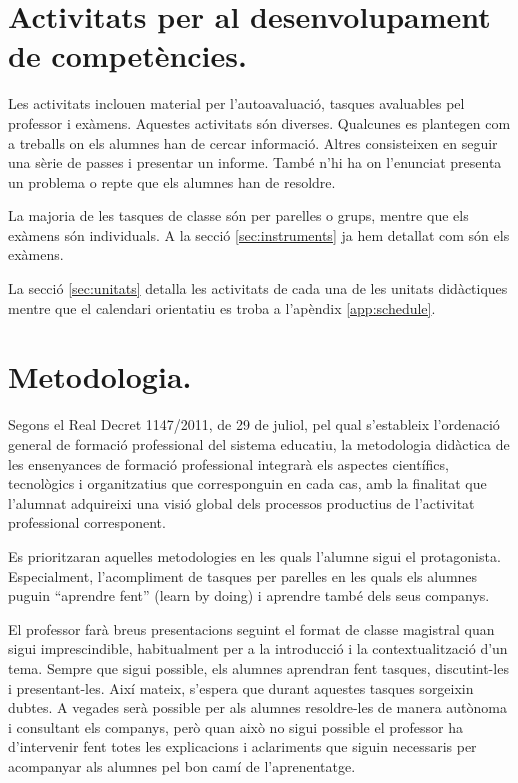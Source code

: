 \documentclass[catalan, a4paper, 12pt, titlepage]{article}
\begin{document}
\section{Activitats per al desenvolupament de competències.}
\label{sec:activitats}

Les activitats inclouen material per l'autoavaluació, tasques avaluables pel professor i exàmens.
Aquestes activitats són diverses.
Qualcunes es plantegen com a treballs on els alumnes han de cercar informació.
Altres consisteixen en seguir una sèrie de passes i presentar un informe.
També n'hi ha on l'enunciat presenta un problema o repte que els alumnes han de resoldre.

La majoria de les tasques de classe són per parelles o grups, mentre que els exàmens són individuals.
A la secció \ref{sec:instruments} ja hem detallat com són els exàmens.

La secció \ref{sec:unitats} detalla les activitats de cada una de les unitats didàctiques mentre que el calendari orientatiu es troba a l'apèndix \ref{app:schedule}.

\section{Metodologia.}
\label{sec:metodologia}

Segons el Real Decret 1147/2011, de 29 de juliol, pel qual s'estableix l'ordenació general de formació professional del sistema educatiu, la metodologia didàctica de les ensenyances de formació professional integrarà els aspectes científics, tecnològics i organitzatius que corresponguin en cada cas, amb la finalitat que l'alumnat adquireixi una visió global dels processos productius de l'activitat professional corresponent.

Es prioritzaran aquelles metodologies en les quals l'alumne sigui el protagonista. Especialment, l'acompliment de tasques per parelles en les quals els alumnes puguin ``aprendre fent'' (learn by doing) i aprendre també dels seus companys.

El professor farà breus presentacions seguint el format de classe magistral quan sigui imprescindible, habitualment per a la introducció i la contextualització d'un tema.
Sempre que sigui possible, els alumnes aprendran fent tasques, discutint-les i presentant-les.
Així mateix, s'espera que durant aquestes tasques sorgeixin dubtes. 
A vegades serà possible per als alumnes resoldre-les de manera autònoma i consultant els companys, però quan això no sigui possible el professor ha d'intervenir fent totes les explicacions i aclariments que siguin necessaris per acompanyar als alumnes pel bon camí de l'aprenentatge.
\end{document}
